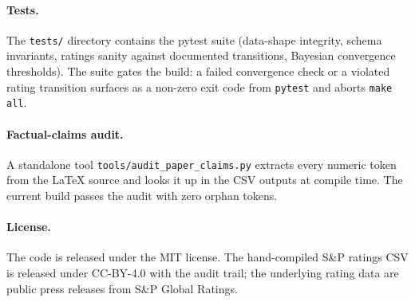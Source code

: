 \paragraph{Tests.} The \texttt{tests/} directory contains the pytest suite (data-shape integrity, schema invariants, ratings sanity against documented transitions, Bayesian convergence thresholds). The suite gates the build: a failed convergence check or a violated rating transition surfaces as a non-zero exit code from \texttt{pytest} and aborts \texttt{make all}.

\paragraph{Factual-claims audit.} A standalone tool \texttt{tools/audit\_paper\_claims.py} extracts every numeric token from the LaTeX source and looks it up in the CSV outputs at compile time. The current build passes the audit with zero orphan tokens.

\paragraph{License.} The code is released under the MIT license. The hand-compiled S\&P ratings CSV is released under CC-BY-4.0 with the audit trail; the underlying rating data are public press releases from S\&P Global Ratings.
